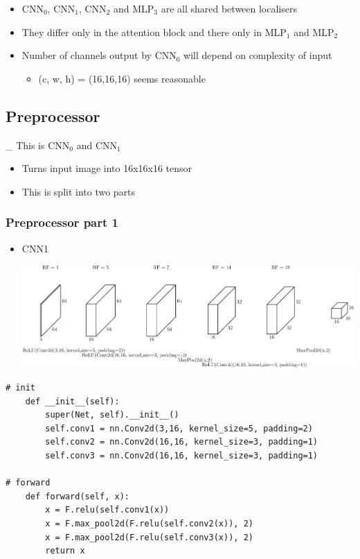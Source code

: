 \documentclass[11pt]{article}
\begin{document}
\begin{itemize}
\item CNN\(_{\text{0}}\), CNN\(_{\text{1}}\), CNN\(_{\text{2}}\) and MLP\(_{\text{3}}\) are all shared between localisers
\item They differ only in the attention block and there only in MLP\(_{\text{1}}\)
and MLP\(_{\text{2}}\)
\item Number of channels output by CNN\(_{\text{0}}\) will depend on complexity of input
\begin{itemize}
\item (c, w, h) = (16,16,16) seems reasonable
\end{itemize}
\end{itemize}

\subsection{Preprocessor}
\label{sec:org77cb49e}
\_ This is CNN\(_{\text{0}}\) and CNN\(_{\text{1}}\)
\begin{itemize}
\item Turns input image into 16x16x16 tensor
\item This is split into two parts
\end{itemize}
\subsubsection{Preprocessor part 1}
\label{sec:orgdf68b3b}
\begin{itemize}
\item CNN1

\begin{center}
\includegraphics[width=.9\linewidth]{./figures/preprocessor.pdf}
\end{center}
\end{itemize}
\begin{verbatim}
# init
	def __init__(self):
		super(Net, self).__init__()
		self.conv1 = nn.Conv2d(3,16, kernel_size=5, padding=2)
		self.conv2 = nn.Conv2d(16,16, kernel_size=3, padding=1)
		self.conv3 = nn.Conv2d(16,16, kernel_size=3, padding=1)

# forward
	def forward(self, x):
		x = F.relu(self.conv1(x))
		x = F.max_pool2d(F.relu(self.conv2(x)), 2)
		x = F.max_pool2d(F.relu(self.conv3(x)), 2)
		return x
\end{verbatim}
\end{document}
